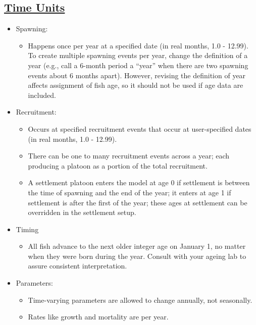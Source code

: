 \subsection[Time Units]{\protect\hyperlink{RecrTiming}{Time Units}}
	\begin{itemize}
		\item Spawning: 
		\begin{itemize}
			\item Happens once per year at a specified date (in real months, 1.0 - 12.99). To create multiple spawning events per year, change the definition of a year (e.g., call a 6-month period a ``year'' when there are two spawning events about 6 months apart). However, revising the definition of year affects assignment of fish age, so it should not be used if age data are included.
		\end{itemize}
		
		\item Recruitment: 
		\begin{itemize}
			\item Occurs at specified recruitment events that occur at user-specified dates (in real months, 1.0 - 12.99).
			\item There can be one to many recruitment events across a year; each producing a platoon as a portion of the total recruitment.
			\item A settlement platoon enters the model at age 0 if settlement is between the time of spawning and the end of the year; it enters at age 1 if settlement is after the first of the year; these ages at settlement can be overridden in the settlement setup.
		\end{itemize}
		
		\item Timing
		\begin{itemize}
			\item All fish advance to the next older integer age on January 1, no matter when they were born during the year. Consult with your ageing lab to assure consistent interpretation.
		\end{itemize}		

		\item Parameters:
		\begin{itemize}
			\item Time-varying parameters are allowed to change annually, not seasonally.
			\item Rates like growth and mortality are per year.
		\end{itemize}
	\end{itemize}

